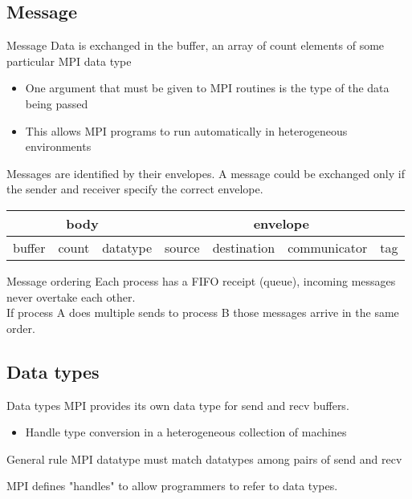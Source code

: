 \documentclass[aspectratio=43]{beamer}
\begin{document}
\subsection{Message}
\begin{frame}{Message}
\justifying
Data is exchanged in the buffer, an array of count elements of some particular MPI data type
\begin{itemize}
\item One argument that must be given to MPI routines is the type of the data being passed
\item This allows MPI programs to run automatically in heterogeneous environments
\end{itemize}
Messages are identified by their envelopes. A message could be exchanged only if the sender and receiver specify the correct envelope.\\[5mm]
\begin{tabular}{|c|c|c||c|c|c|c|}
\hline
\multicolumn{3}{|c||}{body} & \multicolumn{4}{c|}{envelope} \\\hline
buffer & count & datatype & source & destination & communicator & tag\\\hline
\end{tabular}
\end{frame}

\begin{frame}{Message ordering}
\justifying
Each process has a FIFO receipt (queue), incoming messages never overtake each other.\\[5mm]

If process A does multiple sends to process B those messages arrive in the same order.
\end{frame}

\subsection{Data types}
\begin{frame}{Data types}
MPI provides its own data type for send and recv buffers.
\begin{itemize}
\item Handle type conversion in a heterogeneous collection of machines
\end{itemize}
\begin{red1block}{General rule}
MPI datatype must match datatypes among pairs of send and recv
\end{red1block}
MPI defines "handles" to allow programmers to refer to data types.
\end{frame}
\end{document}
